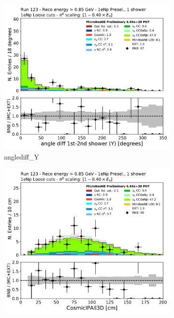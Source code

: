 \begin{figure}[H]
    \centering
    \begin{subfigure}{0.3\textwidth}
    \includegraphics[width=1.0\textwidth]{Sidebands/Figures/1eNp/HighEnergy/HiEext_NPOneShr_NPL_pi0e040/anglediff_Y.pdf}
    \caption{anglediff\_Y}
    \end{subfigure}
    \begin{subfigure}{0.3\textwidth}
    \includegraphics[width=1.0\textwidth]{Sidebands/Figures/1eNp/HighEnergy/HiEext_NPOneShr_NPL_pi0e040/CosmicIPAll3D.pdf}

\end{subfigure}
\end{figure}

